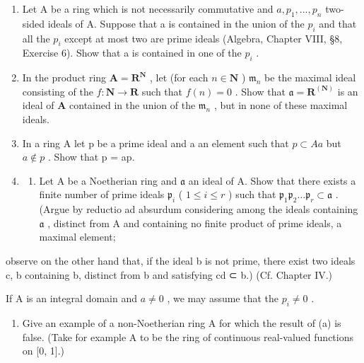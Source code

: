 \begin{enumerate}
\def\labelenumi{\arabic{enumi}.}
\setcounter{enumi}{1}
\item
  Let A be a ring which is not necessarily commutative and \(a, p_{1}, \ldots, p_{n}\) two-sided ideals of A. Suppose that a is contained in the union of the \(p_{i}\) and that all the \(p_{i}\) except at most two are prime ideals (Algebra, Chapter VIII, §8, Exercise 6). Show that a is contained in one of the \(p_{i}\) .
\item
  In the product ring \(\mathbf{A} = \mathbf{R}^{\mathbf{N}}\) , let (for each \(n \in \mathbf{N}\) ) \(\mathfrak{m}_n\) be the maximal ideal consisting of the \(f\colon \mathbf{N} \to \mathbf{R}\) such that \(f(n) = 0\) . Show that \(\mathfrak{a} = \mathbf{R}^{(\mathbf{N})}\) is an ideal of \(\mathbf{A}\) contained in the union of the \(\mathfrak{m}_n\) , but in none of these maximal ideals.
\item
  In a ring A let p be a prime ideal and a an element such that \(p \subset Aa\) but \(a \notin p\) . Show that p = ap.
\item
  \begin{enumerate}
  \def\labelenumii{(\alph{enumii})}
  \tightlist
  \item
    Let A be a Noetherian ring and \(\mathfrak{a}\) an ideal of A. Show that there exists a finite number of prime ideals \(\mathfrak{p}_i\) ( \(1 \leqslant i \leqslant r\) ) such that \(\mathfrak{p}_1\mathfrak{p}_2 \ldots \mathfrak{p}_r \subset \mathfrak{a}\) . (Argue by reductio ad absurdum considering among the ideals containing \(\mathfrak{a}\) , distinct from A and containing no finite product of prime ideals, a maximal element;
  \end{enumerate}
\end{enumerate}

observe on the other hand that, if the ideal b is not prime, there exist two ideals c, b containing b, distinct from b and satisfying cd ⊂ b.) (Cf. Chapter IV.)

If A is an integral domain and \(a \neq 0\) , we may assume that the \(p_{i} \neq 0\) .

\begin{enumerate}
\def\labelenumi{(\alph{enumi})}
\setcounter{enumi}{1}
\tightlist
\item
  Give an example of a non-Noetherian ring A for which the result of (a) is false. (Take for example A to be the ring of continuous real-valued functions on {[}0, 1{]}.)
\end{enumerate}

